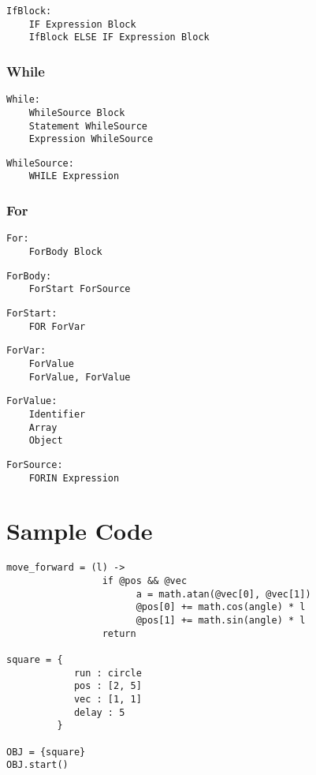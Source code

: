 \documentclass[10pt]{report}
\begin{document}
\begin{verbatim}
IfBlock:
    IF Expression Block
    IfBlock ELSE IF Expression Block
\end{verbatim}

\subsection{While}
\begin{verbatim}
While:
    WhileSource Block
    Statement WhileSource
    Expression WhileSource
\end{verbatim}

\begin{verbatim}
WhileSource:
    WHILE Expression
\end{verbatim}


\subsection{For}
\begin{verbatim}
For:
    ForBody Block
\end{verbatim}

\begin{verbatim}
ForBody:
    ForStart ForSource
\end{verbatim}

\begin{verbatim}
ForStart:
    FOR ForVar
\end{verbatim}

\begin{verbatim}
ForVar:
    ForValue
    ForValue, ForValue
\end{verbatim}

\begin{verbatim}
ForValue:
    Identifier
    Array
    Object
\end{verbatim}

\begin{verbatim}
ForSource:
    FORIN Expression 
\end{verbatim}

\chapter{Sample Code}
\label{chap:sample}

\begin{verbatim}
move_forward = (l) ->
                 if @pos && @vec
                       a = math.atan(@vec[0], @vec[1])
                       @pos[0] += math.cos(angle) * l
                       @pos[1] += math.sin(angle) * l
                 return

square = {
            run : circle
            pos : [2, 5]
            vec : [1, 1]
            delay : 5
         }

OBJ = {square}
OBJ.start()

\end{verbatim}
\end{document}
